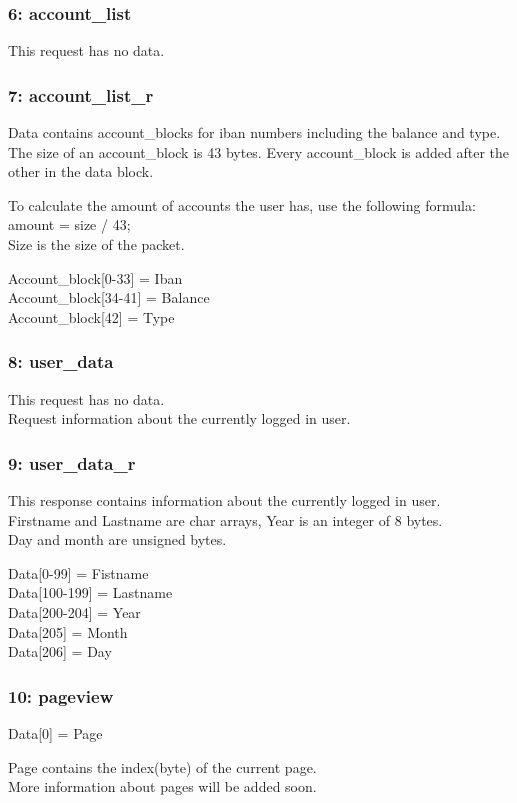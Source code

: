 \documentclass[12pt]{article}
\begin{document}
\subsubsection{6: account\_list}
This request has no data.

\subsubsection{7: account\_list\_r}
Data contains account\_blocks for iban numbers including the balance and type.\\
The size of an account\_block is 43 bytes.
Every account\_block is added after the other in the data block.

To calculate the amount of accounts the user has, use the following formula:\\
amount = size / 43;\\
Size is the size of the packet.

Account\_block[0-33] = Iban\\
Account\_block[34-41] = Balance\\
Account\_block[42] = Type

\subsubsection{8: user\_data}
This request has no data.\\
Request information about the currently logged in user.

\subsubsection{9: user\_data\_r}
This response contains information about the currently logged in user.\\
Firstname and Lastname are char arrays, Year is an integer of 8 bytes.\\
Day and month are unsigned bytes.

Data[0-99] = Fistname\\
Data[100-199] = Lastname\\
Data[200-204] = Year\\
Data[205] = Month\\
Data[206] = Day

\subsubsection{10: pageview}
Data[0] = Page

Page contains the index(byte) of the current page.\\
More information about pages will be added soon.
\end{document}
